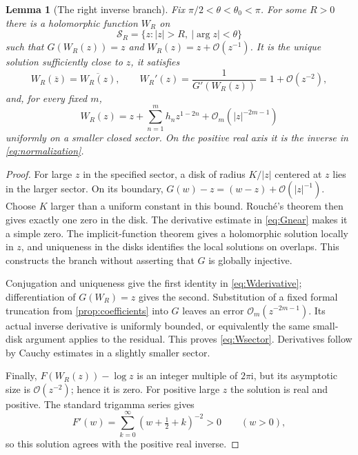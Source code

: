 \documentclass[11pt,a4paper]{article}
\newtheorem{lemma}[lemma]{Lemma}
\theoremstyle{definition}
\numberwithin{equation}{section}
\newcommand{\ii}{\mathrm{i}}
\newcommand{\Oh}{\mathcal O}
\begin{document}
\begin{lemma}[The right inverse branch]
\label{lem:sector}
Fix $\pi/2<\theta<\theta_0<\pi$. For some $R>0$ there is a holomorphic
function $W_R$ on
\[
 \mathcal S_R=\{z:|z|>R,\ |\arg z|<\theta\}
\]
such that $G(W_R(z))=z$ and $W_R(z)=z+\Oh(z^{-1})$.
It is the unique solution sufficiently close to $z$, it satisfies
\begin{equation}
 W_R(\overline z)=\overline{W_R(z)},\qquad
 W_R'(z)=\frac1{G'(W_R(z))}=1+\Oh(z^{-2}),
 \label{eq:Wderivative}
\end{equation}
and, for every fixed $m$,
\begin{equation}
 W_R(z)=z+\sum_{n=1}^m h_nz^{1-2n}+\Oh_m(|z|^{-2m-1})
 \label{eq:Wsector}
\end{equation}
uniformly on a smaller closed sector. On the positive real axis it is
the inverse in \eqref{eq:normalization}.
\end{lemma}
\begin{proof}
For large $z$ in the specified sector, a disk of radius $K/|z|$ centered
at $z$ lies in the larger sector. On its boundary,
$G(w)-z=(w-z)+\Oh(|z|^{-1})$. Choose $K$ larger than a uniform constant
in this bound. Rouch\'e's theorem then gives exactly one zero in the disk.
The derivative estimate in \eqref{eq:Gnear} makes it a simple zero.
The implicit-function theorem gives a holomorphic solution locally in
$z$, and uniqueness in the disks identifies the local solutions on overlaps.
This constructs the branch without asserting that $G$ is globally injective.

Conjugation and uniqueness give the first identity in
\eqref{eq:Wderivative}; differentiation of $G(W_R)=z$ gives the second.
Substitution of a fixed formal truncation from \cref{prop:coefficients}
into $G$ leaves an error $\Oh_m(z^{-2m-1})$. Its actual inverse derivative
is uniformly bounded, or equivalently the same small-disk argument applies
to the residual. This proves \eqref{eq:Wsector}. Derivatives follow by
Cauchy estimates in a slightly smaller sector.

Finally, $F(W_R(z))-\log z$ is an integer multiple of $2\pi\ii$,
but its asymptotic size is $\Oh(z^{-2})$; hence it is zero. For positive
large $z$ the solution is real and positive. The standard trigamma series
\cite{dlmf59} gives
\begin{equation}
 F'(w)=\sum_{k=0}^\infty(w+\tfrac12+k)^{-2}>0\qquad(w>0),
 \label{eq:monotone}
\end{equation}
so this solution agrees with the positive real inverse.
\end{proof}
\end{document}
